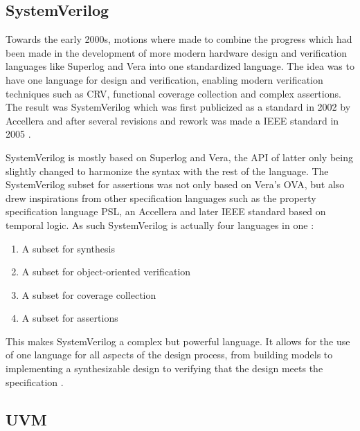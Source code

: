 \documentclass[11pt,a4paper]{report}
\begin{document}
\subsection{SystemVerilog} %

Towards the early 2000s, motions where made to combine the progress which had been made in the development of more
modern hardware design and verification languages like Superlog and Vera into one standardized language. The idea was
to have one language for design and verification, enabling modern verification techniques such as CRV, functional
coverage collection and complex assertions. The result was SystemVerilog which was first publicized as a standard in
2002 by Accellera and after several revisions and rework was made a IEEE standard in 2005 \cite[Sec. 9]{flake2020a}.

SystemVerilog is mostly based on Superlog and Vera, the API of latter only being slightly changed to harmonize the
syntax with the rest of the language. The SystemVerilog subset for assertions was not only based on Vera's OVA, but
also drew inspirations from other specification languages such as the property specification language PSL, an
Accellera and later IEEE standard based on temporal logic. As such SystemVerilog is actually four languages in one
\cite[Ch. 1]{mehta2021introduction}:

\begin{enumerate}
  \item A subset for synthesis
  \item A subset for object-oriented verification
  \item A subset for coverage collection
  \item A subset for assertions
\end{enumerate}

This makes SystemVerilog a complex but powerful language. It allows for the use of one language for all aspects of the design process, from building models to implementing a synthesizable design to verifying that the design meets the specification \cite[Ch. 1]{mehta2021introduction}.

\subsection{UVM} %
\end{document}
